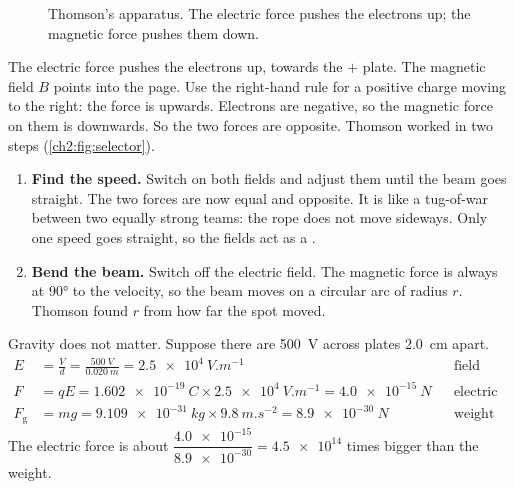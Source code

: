\begin{figure}
  \caption{Thomson's apparatus. The electric force pushes the electrons up; the
    magnetic force pushes them down.}\label{ch2:fig:thomson}
\end{figure}

The electric force pushes the electrons up, towards the $+$ plate. The magnetic
field $B$ points into the page. Use the right-hand rule for a positive charge
moving to the right: the force is upwards. Electrons are negative, so the
magnetic force on them is downwards. So the two forces are opposite. Thomson
worked in two steps (\cref{ch2:fig:selector}).
\begin{enumerate}
  \item \textbf{Find the speed.} Switch on both fields and adjust them until the
        beam goes straight. The two forces are now equal and opposite. It is
        like a tug-of-war between two equally strong teams: the rope does not
        move sideways. Only one speed goes straight, so the fields act as a
        .
  \item \textbf{Bend the beam.} Switch off the electric field. The magnetic force
        is always at \ang{90} to the velocity, so the beam moves on a circular
        arc of radius $r$. Thomson found $r$ from how far the spot moved.
\end{enumerate}
Gravity does not matter. Suppose there are \qty{500}{V} across plates
\qty{2.0}{cm} apart.
\begin{align*}
  E &= \frac{V}{d} = \frac{\qty{500}{V}}{\qty{0.020}{m}} = \qty{2.5e4}{V.m^{-1}}
    && \text{field between the plates}\\
  F &= qE = \qty{1.602e-19}{C}\times\qty{2.5e4}{V.m^{-1}} = \qty{4.0e-15}{N}
    && \text{electric force}\\
  F_\mathrm{g} &= mg = \qty{9.109e-31}{kg}\times\qty{9.8}{m.s^{-2}} = \qty{8.9e-30}{N}
    && \text{weight}
\end{align*}
The electric force is about
$\dfrac{\num{4.0e-15}}{\num{8.9e-30}} = \num{4.5e14}$ times bigger than the weight.

